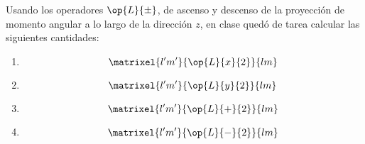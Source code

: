 \documentclass[../main.tex]{subfiles}
\begin{document}
\begin{problema}[10]
	Usando los operadores \(\op{L}{\pm}\), de ascenso y descenso de la
	proyección de momento angular a lo largo de la dirección \(z\),
	en clase quedó de tarea calcular las siguientes cantidades:

	\begin{enumerate}
		\item
		      \begin{equation*}
			      \matrixel{l^{\prime}m^{\prime}}{\op{L}{x}{2}}{lm}
		      \end{equation*}
		\item
		      \begin{equation*}
			      \matrixel{l^{\prime}m^{\prime}}{\op{L}{y}{2}}{lm}
		      \end{equation*}
		\item
		      \begin{equation*}
			      \matrixel{l^{\prime}m^{\prime}}{\op{L}{+}{2}}{lm}
		      \end{equation*}
		\item
		      \begin{equation*}
			      \matrixel{l^{\prime}m^{\prime}}{\op{L}{-}{2}}{lm}
		      \end{equation*}
	\end{enumerate}
\end{problema}
\end{document}
